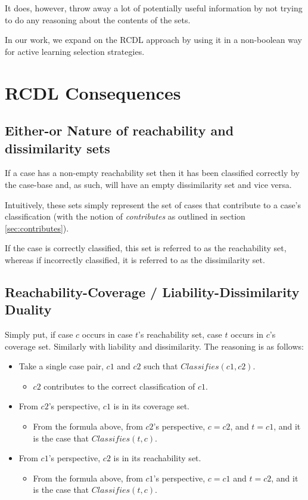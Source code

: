 \documentclass[a4paper,11pt]{report}
\begin{document}
It does, however, throw away a lot of potentially useful information by not trying to do any reasoning about the contents of the sets.

In our work, we expand on the RCDL approach by using it in a non-boolean way for active learning selection strategies.

\section{RCDL Consequences}

\subsection{Either-or Nature of reachability and dissimilarity sets}
If a case has a non-empty reachability set then it has been classified correctly by the case-base and, as such, will have an empty dissimilarity set and vice versa.

Intuitively, these sets simply represent the set of cases that contribute to a case's classification (with the notion of \emph{contributes} as outlined in section \ref{sec:contributes}). 

If the case is correctly classified, this set is referred to as the reachability set, whereas if incorrectly classified, it is referred to as the dissimilarity set.

\subsection{Reachability-Coverage / Liability-Dissimilarity Duality\label{sec:duality}}
Simply put, if case $c$ occurs in case $t$'s reachability set, case $t$ occurs in $c$'s coverage set. Similarly with liability and dissimilarity.
The reasoning is as follows:
\begin{itemize}
	\item Take a single case pair, $c1$ and $c2$ such that $Classifies(c1, c2)$.
	\begin{itemize}
		\item $c2$ contributes to the correct classification of $c1$.
	\end{itemize}
	\item From $c2$'s perspective, $c1$ is in its coverage set.
	\begin{itemize}
		\item From the formula above, from $c2$'s perspective, $c=c2$, and $t=c1$, and it is the case that $Classifies(t, c)$.
	\end{itemize}
	\item From $c1$'s perspective, $c2$ is in its reachability set.
	\begin{itemize}
		\item From the formula above, from $c1$'s perspective, $c=c1$ and $t=c2$, and it is the case that $Classifies(t, c)$.
	\end{itemize}
\end{itemize}
\end{document}
